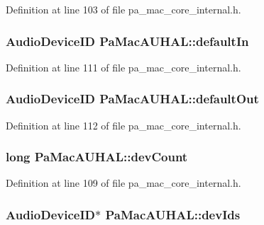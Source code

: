 Definition at line 103 of file pa\+\_\+mac\+\_\+core\+\_\+internal.\+h.

\subsubsection[{\texorpdfstring{default\+In}{defaultIn}}]{\setlength{\rightskip}{0pt plus 5cm}Audio\+Device\+ID Pa\+Mac\+A\+U\+H\+A\+L\+::default\+In}\hypertarget{struct_pa_mac_a_u_h_a_l_adcadc778ee059bbbd6cbcb76ac93931b}{}\label{struct_pa_mac_a_u_h_a_l_adcadc778ee059bbbd6cbcb76ac93931b}


Definition at line 111 of file pa\+\_\+mac\+\_\+core\+\_\+internal.\+h.

\subsubsection[{\texorpdfstring{default\+Out}{defaultOut}}]{\setlength{\rightskip}{0pt plus 5cm}Audio\+Device\+ID Pa\+Mac\+A\+U\+H\+A\+L\+::default\+Out}\hypertarget{struct_pa_mac_a_u_h_a_l_ae4876213ad54aeebea056e458dff4bfd}{}\label{struct_pa_mac_a_u_h_a_l_ae4876213ad54aeebea056e458dff4bfd}


Definition at line 112 of file pa\+\_\+mac\+\_\+core\+\_\+internal.\+h.

\subsubsection[{\texorpdfstring{dev\+Count}{devCount}}]{\setlength{\rightskip}{0pt plus 5cm}long Pa\+Mac\+A\+U\+H\+A\+L\+::dev\+Count}\hypertarget{struct_pa_mac_a_u_h_a_l_a192eec8334acc33171a90d4c6dce4c90}{}\label{struct_pa_mac_a_u_h_a_l_a192eec8334acc33171a90d4c6dce4c90}


Definition at line 109 of file pa\+\_\+mac\+\_\+core\+\_\+internal.\+h.

\subsubsection[{\texorpdfstring{dev\+Ids}{devIds}}]{\setlength{\rightskip}{0pt plus 5cm}Audio\+Device\+ID$\ast$ Pa\+Mac\+A\+U\+H\+A\+L\+::dev\+Ids}\hypertarget{struct_pa_mac_a_u_h_a_l_a2b9cc8201b12b88cea1acb9e2cc30c21}{}\label{struct_pa_mac_a_u_h_a_l_a2b9cc8201b12b88cea1acb9e2cc30c21}


